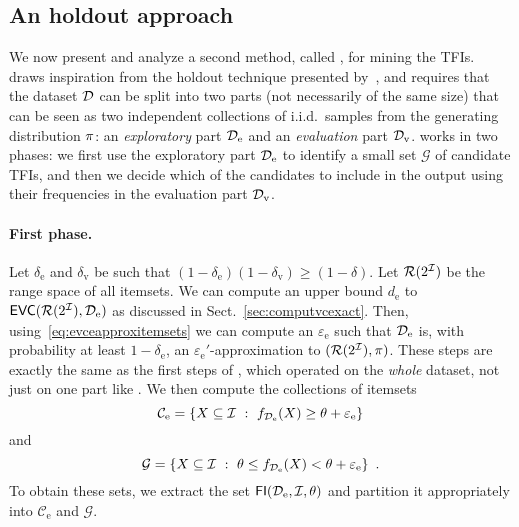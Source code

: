 \subsection{An holdout approach}\label{sec:holdout}
We now present and analyze a second method, called \ALGHOLDOUT{}, for
mining the TFIs. \ALGHOLDOUT{} draws inspiration from the holdout technique
presented by~\citet{Webb07}, and requires that the dataset ${\cal D}$ can be
split into two parts (not necessarily of the same size) that can be seen as two
independent collections of i.i.d.~samples from the generating distribution
$\pi$: an \emph{exploratory} part ${\cal D}_\mathrm{e}$ and an \emph{evaluation}
part ${\cal D}_\mathrm{v}$.  \ALGHOLDOUT{} works in two phases: we first use the
exploratory part ${\cal D}_\mathrm{e}$ to identify a small set $\mathcal{G}$ of
candidate TFIs, and then we decide which of the candidates to include in the
output using their frequencies in the evaluation part ${\cal D}_\mathrm{v}$.

\paragraph{First phase.} Let $\delta_\mathrm{e}$ and $\delta_\mathrm{v}$ be such
that $(1-\delta_\mathrm{e})(1-\delta_\mathrm{v})\ge(1-\delta)$. Let
$\mathcal{R}(2^{\cal I})$ be the range space of all itemsets. We can compute an upper
bound $d_\mathrm{e}$ to $\mathsf{EVC}(\mathcal{R}(2^{\cal I}), {\cal D}_\mathrm{e})$ as discussed in
Sect.~\ref{sec:computvcexact}. Then, using~\eqref{eq:evceapproxitemsets} we can compute an
$\varepsilon_\mathrm{e}$ such that ${\cal D}_\mathrm{e}$ is, with probability at
least $1-\delta_\mathrm{e}$, an $\varepsilon_\mathrm{e}'$-approximation to
$(\mathcal{R}(2^{\cal I}),\pi)$. These steps are exactly the same as the first steps of
\ALG{}, which operated on the \emph{whole} dataset, not just on one part like
\ALGHOLDOUT{}. We then compute the
collections of itemsets
\[
	\mathcal{C}_\mathrm{e}=\{X\subseteq{\cal I} ~:~
	f_{{\cal D}_\mathrm{e}}(X)\ge\theta+\varepsilon_\mathrm{e}\}\]
and
\[
\mathcal{G}=\{X\subseteq{\cal I} ~:~ \theta\le
	f_{{\cal D}_\mathrm{e}}(X)<\theta+\varepsilon_\mathrm{e}\}\enspace.
\]
To obtain these sets, we extract the set $\mathsf{FI}({\cal D}_\mathrm{e},{\cal I},\theta)$ and
partition it appropriately into $\mathcal{C}_\mathrm{e}$ and $\mathcal{G}$.

